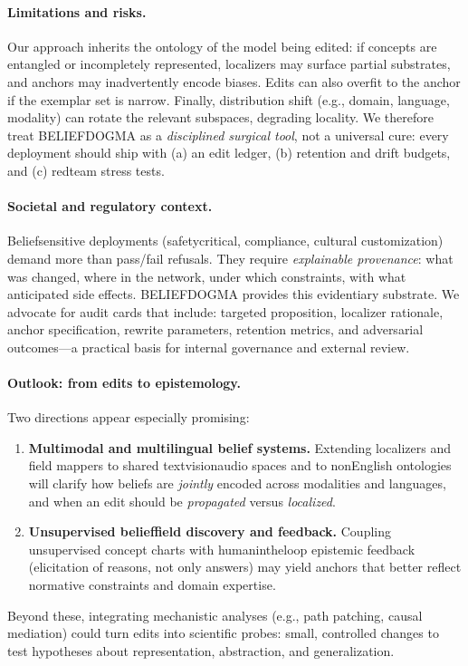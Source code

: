 \documentclass[11pt]{article}
\begin{document}
\paragraph{Limitations and risks.}
Our approach inherits the ontology of the model being edited: if concepts are entangled or incompletely represented, localizers may surface partial substrates, and anchors may inadvertently encode biases. Edits can also overfit to the anchor if the exemplar set is narrow. Finally, distribution shift (e.g., domain, language, modality) can rotate the relevant subspaces, degrading locality. We therefore treat \textsc{BELIEF\textendash DOGMA} as a \emph{ disciplined surgical tool}, not a universal cure: every deployment should ship with (a) an edit ledger, (b) retention and drift budgets, and (c) red\textendash team stress tests.

\paragraph{Societal and regulatory context.}
Belief\textendash sensitive deployments (safety\textendash critical, compliance, cultural customization) demand more than pass/fail refusals. They require \emph{explainable provenance}: what was changed, where in the network, under which constraints, with what anticipated side effects. \textsc{BELIEF\textendash DOGMA} provides this evidentiary substrate. We advocate for audit cards that include: targeted proposition, localizer rationale, anchor specification, rewrite parameters, retention metrics, and adversarial outcomes---a practical basis for internal governance and external review.

\paragraph{Outlook: from edits to epistemology.}
Two directions appear especially promising:
\begin{enumerate}
\item \textbf{Multimodal and multilingual belief systems.} Extending localizers and field mappers to shared text\textendash vision\textendash audio spaces and to non\textendash English ontologies will clarify how beliefs are \emph{jointly} encoded across modalities and languages, and when an edit should be \emph{propagated} versus \emph{localized}.
\item \textbf{Unsupervised belief\textendash field discovery and feedback.} Coupling unsupervised concept charts with human\textendash in\textendash the\textendash loop epistemic feedback (elicitation of reasons, not only answers) may yield anchors that better reflect normative constraints and domain expertise.
\end{enumerate}
Beyond these, integrating mechanistic analyses (e.g., path patching, causal mediation) could turn edits into scientific probes: small, controlled changes to test hypotheses about representation, abstraction, and generalization.
\end{document}
